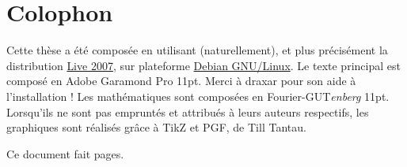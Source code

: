 \chapter*{Colophon}%
Cette thèse a été composée en utilisant \myLaTeXe{} (naturellement), et plus précisément la distribution \href{http://tug.org/texlive/doc/texlive-fr/live.html}{\myTeX Live 2007}, sur plateforme \href{http://www.debian.org/index.fr.html}{Debian GNU/Linux}. Le texte principal est composé en Adobe Garamond Pro 11pt. Merci à draxar pour son aide à l'installation ! Les mathématiques sont composées en Fourier-GUT\emph{enberg} 11pt. Lorsqu'ils ne sont pas empruntés et attribués à leurs auteurs respectifs, les graphiques sont réalisés grâce à TikZ et PGF, de Till Tantau.

Ce document fait \pageref{LastPage} pages.

\ornementChapitre
